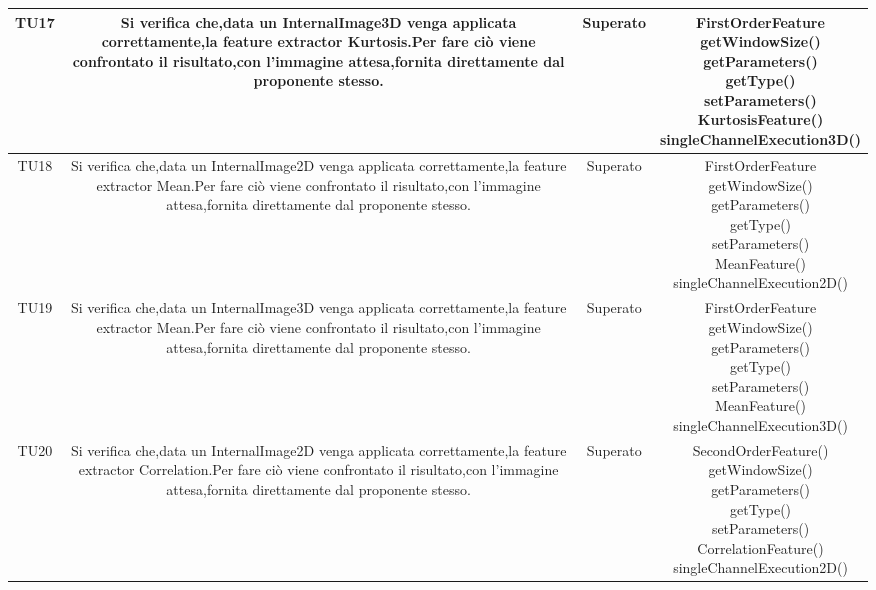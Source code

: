 \begin{center}
\begin{longtable}{|c|c|c|c|}
\hline
TU17 & \parbox[t]{\larghezza}{ Si verifica che,data un InternalImage3D venga applicata correttamente,la feature extractor Kurtosis.Per fare ciò viene confrontato il risultato,con l'immagine attesa,fornita direttamente dal proponente stesso. } & Superato & \parbox[t]{\dimTipo} { FirstOrderFeature \\ getWindowSize() \\ getParameters() \\ getType() \\ setParameters() \\ KurtosisFeature() \\ singleChannelExecution3D() \\ } \\
\hline
TU18 & \parbox[t]{\larghezza}{ Si verifica che,data un InternalImage2D venga applicata correttamente,la feature extractor Mean.Per fare ciò viene confrontato il risultato,con l'immagine attesa,fornita direttamente dal proponente stesso. } & Superato & \parbox[t]{\dimTipo} { FirstOrderFeature \\ getWindowSize() \\ getParameters() \\ getType() \\ setParameters() \\ MeanFeature() \\ singleChannelExecution2D() \\ } \\
\hline
TU19 & \parbox[t]{\larghezza}{ Si verifica che,data un InternalImage3D venga applicata correttamente,la feature extractor Mean.Per fare ciò viene confrontato il risultato,con l'immagine attesa,fornita direttamente dal proponente stesso. } & Superato & \parbox[t]{\dimTipo} { FirstOrderFeature \\ getWindowSize() \\ getParameters() \\ getType() \\ setParameters() \\ MeanFeature() \\ singleChannelExecution3D() \\ } \\
\hline
TU20 & \parbox[t]{\larghezza}{ Si verifica che,data un InternalImage2D venga applicata correttamente,la feature extractor Correlation.Per fare ciò viene confrontato il risultato,con l'immagine attesa,fornita direttamente dal proponente stesso. } & Superato & \parbox[t]{\dimTipo} { SecondOrderFeature() \\ getWindowSize() \\ getParameters() \\ getType() \\ setParameters()  \\ CorrelationFeature() \\ singleChannelExecution2D() \\ } \\

\end{longtable}
\end{center}
